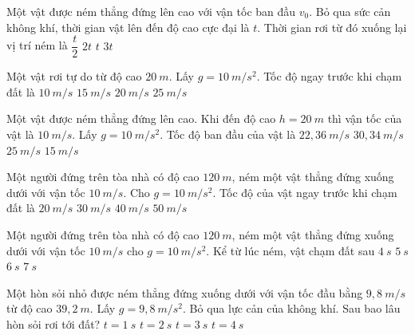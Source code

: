 \begin{ex}
Một vật được ném thẳng đứng lên cao với vận tốc ban đầu $v_0$. Bỏ qua sức cản không khí, thời gian vật lên đến độ cao cực đại là $t$. Thời gian rơi từ đó xuống lại vị trí ném là
\choice
{$\dfrac{t}{2}$}
{$2t$}
{\True $t$}
{$3t$}
\loigiai{}
\end{ex}

\begin{ex}
Một vật rơi tự do từ độ cao $20\ m$. Lấy $g = 10\ m/s^2$. Tốc độ ngay trước khi chạm đất là
\choice
{$10\ m/s$}
{$15\ m/s$}
{\True $20\ m/s$}
{$25\ m/s$}
\loigiai{}
\end{ex}

\begin{ex}
Một vật được ném thẳng đứng lên cao. Khi đến độ cao $h = 20\ m$ thì vận tốc của vật là $10\ m/s$. Lấy $g = 10\ m/s^2$. Tốc độ ban đầu của vật là
\choice
{\True $22,36\ m/s$}
{$30,34\ m/s$}
{$25\ m/s$}
{$15\ m/s$}
\loigiai{}
\end{ex}
\begin{ex}%
Một người đứng trên tòa nhà có độ cao $120\ m$, ném một vật thẳng đứng xuống dưới với vận tốc $10 \ m/s$. Cho $g=10 \ m/s^2$. Tốc độ của vật ngay trước khi chạm đất là
\choice
{$20 \ m/s$}
{$30 \ m/s$}
{$40 \ m/s$}
{\True $50\ m/s$}
\loigiai{}
\end{ex}
\begin{ex}%
Một người đứng trên tòa nhà có độ cao $120\ m$, ném một vật thẳng đứng xuống dưới với vận tốc $10 \ m/s$ cho $g=10 \ m/s^2$. Kể từ lúc ném, vật chạm đất sau			
\choice
{\True $4\ s$}
{$5\ s$}
{$6\ s$}
{$7\ s$}
\loigiai{}
\end{ex}
\begin{ex}%
Một hòn sỏi nhỏ được ném thẳng đứng xuống dưới với vận tốc đầu bằng $9,8\ m/s$ từ độ cao $39,2\ m$. Lấy $g = 9,8\  m/s^2$. Bỏ qua lực cản của không khí. Sau bao lâu hòn sỏi rơi tới đất?
\choice
{$t=1\ s$}
{\True $t=2\ s$}
{$t=3\ s$}
{$t=4\ s$}
\end{ex}
